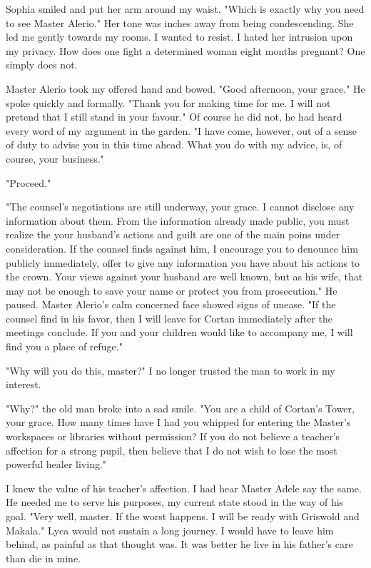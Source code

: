 \documentclass{article}
\begin{document}
Sophia smiled and put her arm around my waist. "Which is exactly why you need to see Master Alerio." Her tone was inches away from being condescending. She led me gently towards my rooms. I wanted to resist. I hated her intrusion upon my privacy. How does one fight a determined woman eight months pregnant? One simply does not. 

Master Alerio took my offered hand and bowed. "Good afternoon, your grace." He spoke quickly and formally. "Thank you for making time for me. I will not pretend that I still stand in your favour." Of course he did not, he had heard every word of my argument in the garden. "I have come, however, out of a sense of duty to advise you in this time ahead. What you do with my advice, is, of course, your business." 

"Proceed."

"The counsel's negotiations are still underway, your grace. I cannot disclose any information about them. From the information already made public, you must realize the your husband's actions and guilt are one of the main poins under consideration. If the counsel finds against him, I encourage you to denounce him publicly immediately, offer to give any information you have about his actions to the crown. Your views against your husband are well known, but as his wife, that may not be enough to save your name or protect you from prosecution." He paused. Master Alerio's calm concerned face showed signs of unease. "If the counsel find in his favor, then I will leave for Cortan immediately after the meetings conclude. If you and your children would like to accompany me, I will find you a place of refuge."

"Why will you do this, master?" I no longer trusted the man to work in my interest.

"Why?" the old man broke into a sad smile. "You are a child of Cortan's Tower, your grace. How many times have I had you whipped for entering the Master's workspaces or libraries without permission? If you do not believe a teacher's affection for a strong pupil, then believe that I do not wish to lose the most powerful healer living."

I knew the value of his teacher's affection. I had hear Master Adele say the same. He needed me to serve his purposes, my current state stood in the way of his goal. "Very well, master. If the worst happens. I will be ready with Griswold and Makala." Lyca would not sustain a long journey. I would have to leave him behind, as painful as that thought was. It was better he live in his father's care than die in mine.
\end{document}
